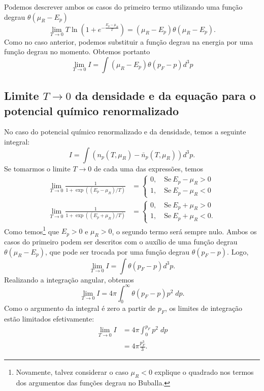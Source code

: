 Podemos descrever ambos os casos do primeiro termo utilizando uma função degrau $\theta(\mu_R - E_p)$
\begin{equation}
	\lim_{T \to 0} T \ln(1+e^{-\frac{E_p - \mu_R}{T}}) = (\mu_R - E_p)\theta(\mu_R - E_p).
\end{equation}
%
Como no caso anterior, podemos substituir a função degrau na energia por uma função degrau no momento. Obtemos portanto
\begin{equation}
	\lim_{T \to 0} I = \int (\mu_R - E_p)\theta(p_F - p) d^3p
\end{equation}
%

\subsection{Limite $T \to 0$ da densidade e da equação para o potencial químico renormalizado}

No caso do potencial químico renormalizado e da densidade, temos a seguinte integral:
\begin{equation}
	I = \int (n_p(T,\mu_R) - \bar{n}_p(T, \mu_R)) d^3p.
\end{equation}
%
Se tomarmos o limite $T \to 0$ de cada uma das expressões, temos
\begin{align}
	\lim_{T \to 0} \frac{1}{1+\exp((E_p - \mu_R)/T)} &= \begin{cases} 0, \quad \textrm{Se}~E_p - \mu_R > 0 \\ 1, \quad \textrm{Se}~E_p - \mu_R < 0 \end{cases} \\
	\lim_{T \to 0} \frac{1}{1+\exp((E_p + \mu_R)/T)} &= \begin{cases} 0, \quad \textrm{Se}~E_p + \mu_R > 0 \\ 1, \quad \textrm{Se}~E_p + \mu_R < 0. \end{cases}
\end{align}
%
Como temos\footnote{Novamente, talvez considerar o caso $\mu_R < 0$ explique o quadrado nos termos dos argumentos das funções degrau no Buballa.} que $E_p > 0$ e $\mu_R > 0$, o segundo termo será sempre nulo. Ambos os casos do primeiro podem ser descritos com o auxílio de uma função degrau $\theta(\mu_R - E_p)$, que pode ser trocada por uma função degrau $\theta(p_F - p)$. Logo,
\begin{equation}
	\lim_{T \to 0} I = \int \theta(p_F - p)d^3p.
\end{equation}
%
Realizando a integração angular, obtemos
\begin{equation}
	\lim_{T \to 0} I = 4\pi \int_0^\infty \theta(p_F - p) p^2 \;dp.
\end{equation}
%
Como o argumento da integral é zero a partir de $p_F$, os limites de integração estão limitados efetivamente:
\begin{align}
	\lim_{T \to 0} I &= 4\pi \int_0^{p_F} p^2 \;dp \\
	&= 4\pi \frac{p_F^3}{3}.
\end{align}

